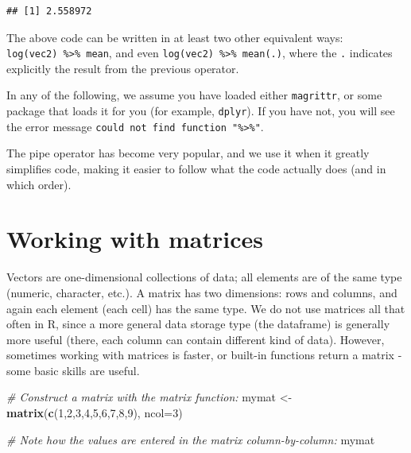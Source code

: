 \documentclass[]{book}
\newenvironment{Shaded}{\begin{snugshade}}{\end{snugshade}}
\newcommand{\CommentTok}[1]{\textcolor[rgb]{0.56,0.35,0.01}{\textit{#1}}}
\newcommand{\DataTypeTok}[1]{\textcolor[rgb]{0.13,0.29,0.53}{#1}}
\newcommand{\DecValTok}[1]{\textcolor[rgb]{0.00,0.00,0.81}{#1}}
\newcommand{\KeywordTok}[1]{\textcolor[rgb]{0.13,0.29,0.53}{\textbf{#1}}}
\newcommand{\NormalTok}[1]{#1}
\newcommand{\OperatorTok}[1]{\textcolor[rgb]{0.81,0.36,0.00}{\textbf{#1}}}
\newcommand{\StringTok}[1]{\textcolor[rgb]{0.31,0.60,0.02}{#1}}
\begin{document}
\begin{Shaded}
\end{Shaded}

\begin{verbatim}
## [1] 2.558972
\end{verbatim}

The above code can be written in at least two other equivalent ways: \texttt{log(vec2)\ \%\textgreater{}\%\ mean}, and even \texttt{log(vec2)\ \%\textgreater{}\%\ mean(.)}, where the \texttt{.} indicates explicitly the result from the previous operator.

In any of the following, we assume you have loaded either \texttt{magrittr}, or some package that loads it for you (for example, \texttt{dplyr}). If you have not, you will see the error message \texttt{could\ not\ find\ function\ "\%\textgreater{}\%"}.

The pipe operator has become very popular, and we use it when it greatly simplifies code, making it easier to follow what the code actually does (and in which order).

\hypertarget{matrices}{%
\section{Working with matrices}\label{matrices}}

Vectors are one-dimensional collections of data; all elements are of the same type (numeric, character, etc.). A matrix has two dimensions: rows and columns, and again each element (each cell) has the same type. We do not use matrices all that often in R, since a more general data storage type (the dataframe) is generally more useful (there, each column can contain different kind of data). However, sometimes working with matrices is faster, or built-in functions return a matrix - some basic skills are useful.

\begin{Shaded}
\begin{Highlighting}[]
\CommentTok{# Construct a matrix with the matrix function:}
\NormalTok{mymat <-}\StringTok{ }\KeywordTok{matrix}\NormalTok{(}\KeywordTok{c}\NormalTok{(}\DecValTok{1}\NormalTok{,}\DecValTok{2}\NormalTok{,}\DecValTok{3}\NormalTok{,}\DecValTok{4}\NormalTok{,}\DecValTok{5}\NormalTok{,}\DecValTok{6}\NormalTok{,}\DecValTok{7}\NormalTok{,}\DecValTok{8}\NormalTok{,}\DecValTok{9}\NormalTok{), }\DataTypeTok{ncol=}\DecValTok{3}\NormalTok{)}

\CommentTok{# Note how the values are entered in the matrix column-by-column:}
\NormalTok{mymat}
\end{Highlighting}
\end{Shaded}
\end{document}
